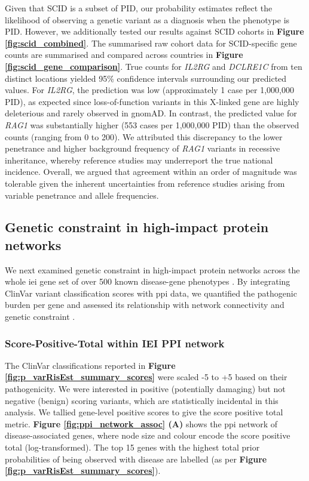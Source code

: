 Given that SCID is a subset of PID, our probability estimates reflect the likelihood of observing a genetic variant as a diagnosis when the phenotype is PID. However, we additionally tested our results against SCID cohorts in 
 \textbf{Figure \ref{fig:scid_combined}}.
 The summarised raw cohort data for SCID-specific gene counts are summarised and compared across countries in \textbf{Figure \ref{fig:scid_gene_comparison}}.
True counts for \textit{IL2RG} and \textit{DCLRE1C} from ten distinct locations yielded 95\% confidence intervals surrounding our predicted values. For \textit{IL2RG}, the prediction was low (approximately 1 case per 1,000,000 PID), as expected since loss-of-function variants in this X-linked gene are highly deleterious and rarely observed in gnomAD. In contrast, the predicted value for \textit{RAG1} was substantially higher (553 cases per 1,000,000 PID) than the observed counts (ranging from 0 to 200). We attributed this discrepancy to the lower penetrance and higher background frequency of \textit{RAG1} variants in recessive inheritance, whereby reference studies may underreport the true national incidence. Overall, we argued that agreement within an order of magnitude was tolerable given the inherent uncertainties from reference studies arising from variable penetrance and allele frequencies.

\FloatBarrier
\subsection{Genetic constraint in high-impact protein networks}

We next examined genetic constraint in high-impact protein networks across the whole \ac{iei} gene set of over 500 known disease-gene phenotypes \cite{tangye_human_2022}. By integrating ClinVar variant classification scores with \ac{ppi} data, we quantified the pathogenic burden per gene and assessed its relationship with network connectivity and genetic constraint
\cite{szklarczyk2025string, karczewski2020mutational}.

\subsubsection{Score-Positive-Total within IEI PPI network}

The ClinVar classifications reported in 
\textbf{Figure \ref{fig:p_varRisEst_summary_scores}} were scaled -5 to +5 based on their pathogenicity. 
We were interested in positive (potentially damaging) but not negative (benign) scoring variants, which are statistically incidental in this analysis. 
We tallied gene-level positive scores to give the score positive total metric. 
\textbf{Figure \ref{fig:ppi_network_assoc} (A)} shows the \ac{ppi} network of disease-associated genes, where node size and colour encode the score positive total (log-transformed). 
The top 15 genes with the highest total prior probabilities of being observed with disease are labelled (as per \textbf{Figure \ref{fig:p_varRisEst_summary_scores}}).

